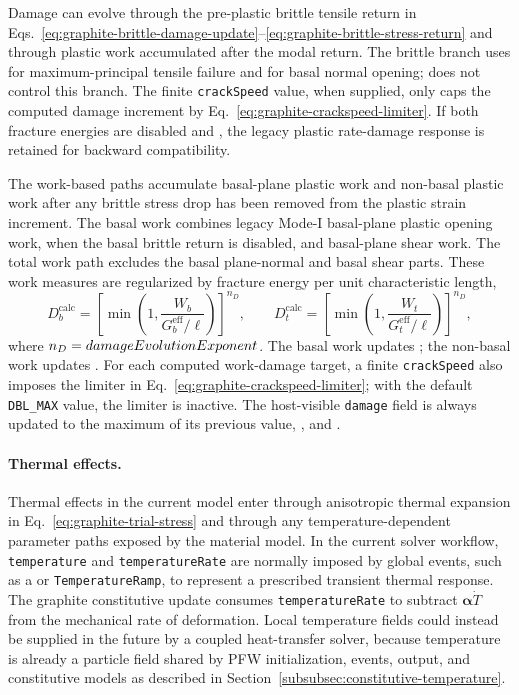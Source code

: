 Damage can evolve through the pre-plastic brittle tensile return in Eqs.~\eqref{eq:graphite-brittle-damage-update}--\eqref{eq:graphite-brittle-stress-return} and through plastic work accumulated after the modal return.  The brittle branch uses  for maximum-principal tensile failure and  for basal normal opening;  does not control this branch.  The finite \texttt{crackSpeed} value, when supplied, only caps the computed damage increment by Eq.~\eqref{eq:graphite-crackspeed-limiter}.  If both fracture energies are disabled and , the legacy plastic rate-damage response is retained for backward compatibility.

The work-based paths accumulate basal-plane plastic work and non-basal plastic work after any brittle stress drop has been removed from the plastic strain increment.  The basal work combines legacy Mode-I basal-plane plastic opening work, when the basal brittle return is disabled, and basal-plane shear work.  The total work path excludes the basal plane-normal and basal shear parts.  These work measures are regularized by fracture energy per unit characteristic length,
\begin{equation}
  D_b^{\mathrm{calc}}=
     \left[\min\left(1,\frac{W_b}{G_b^{\mathrm{eff}}/\ell}\right)\right]^{n_D},
  \qquad
  D_t^{\mathrm{calc}}=
     \left[\min\left(1,\frac{W_t}{G_t^{\mathrm{eff}}/\ell}\right)\right]^{n_D},
  \label{eq:graphite-work-damage}
\end{equation}
where \(n_D=damageEvolutionExponent\).  The basal work updates ; the non-basal work updates .  For each computed work-damage target, a finite \texttt{crackSpeed} also imposes the limiter in Eq.~\eqref{eq:graphite-crackspeed-limiter}; with the default \texttt{DBL\_MAX} value, the limiter is inactive.  The host-visible \texttt{damage} field is always updated to the maximum of its previous value, , and .

\paragraph{Thermal effects.}
Thermal effects in the current model enter through anisotropic thermal expansion in Eq.~\eqref{eq:graphite-trial-stress} and through any temperature-dependent parameter paths exposed by the material model.  In the current solver workflow, \texttt{temperature} and \texttt{temperatureRate} are normally imposed by global events, such as a  or \texttt{TemperatureRamp}, to represent a prescribed transient thermal response.  The graphite constitutive update consumes \texttt{temperatureRate} to subtract \(\boldsymbol{\alpha}\dot T\) from the mechanical rate of deformation.  Local temperature fields could instead be supplied in the future by a coupled heat-transfer solver, because temperature is already a particle field shared by PFW initialization, events, output, and constitutive models as described in Section~\ref{subsubsec:constitutive-temperature}.

